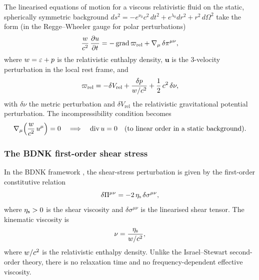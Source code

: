 The linearised equations of motion for a viscous relativistic fluid
on the static, spherically symmetric background
$ds^{2} = -e^{\nu_{0}}c^{2}\,dt^{2} + e^{\lambda_{0}}dr^{2}
+ r^{2}\,d\Omega^{2}$
take the form (in the Regge--Wheeler gauge for polar perturbations)
\begin{equation}\label{eq:rel-10-236R}
  \frac{w}{c^{2}}\,\frac{\partial u}{\partial t}
  = -\operatorname{grad}\varpi_{\mathrm{rel}}
    + \nabla_{\mu}\,\delta\pi^{\mu\nu},
\end{equation}
where $w = \varepsilon + p$ is the relativistic enthalpy density,
$\mathbf{u}$ is the 3-velocity perturbation in the local rest frame,
and
\begin{equation}\label{eq:rel-10-238R}
  \varpi_{\mathrm{rel}}
  = -\delta V_{\mathrm{rel}} + \frac{\delta p}{w/c^{2}}
    + \frac{1}{2}\,c^{2}\,\delta\nu,
\end{equation}
with $\delta\nu$ the metric perturbation and
$\delta V_{\mathrm{rel}}$ the relativistic gravitational potential
perturbation.  The incompressibility condition becomes
\begin{equation}\label{eq:rel-10-237R}
  \nabla_{\mu}\!\left(\frac{w}{c^{2}}\,u^{\mu}\right) = 0
  \quad\Longrightarrow\quad
  \operatorname{div}u = 0
  \quad\text{(to linear order in a static background).}
\end{equation}

\subsubsection*{The BDNK first-order shear stress}

In the BDNK framework \citep{BemficaDN2018,Kovtun2019}, the
shear-stress perturbation is given by the first-order constitutive
relation
\begin{equation}\label{eq:rel-10-BDNK-shear-globe}
  \delta\Pi^{\mu\nu}
  = -2\,\eta_{\mathrm{s}}\,\delta\sigma^{\mu\nu},
\end{equation}
where $\eta_{\mathrm{s}} > 0$ is the shear viscosity and
$\delta\sigma^{\mu\nu}$ is the linearised shear tensor.
The kinematic viscosity is
\begin{equation}\label{eq:rel-10-nu-globe}
  \nu = \frac{\eta_{\mathrm{s}}}{w/c^{2}},
\end{equation}
where $w/c^{2}$ is the relativistic enthalpy density.
Unlike the Israel--Stewart second-order theory, there is no
relaxation time and no frequency-dependent effective viscosity.

